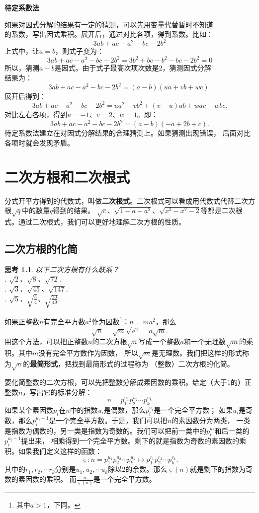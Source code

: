 \documentclass[12pt,UTF8]{ctexbook}
\newtheorem{sk}{思考}[section]
\begin{document}
\noindent \textbf{待定系数法}

\indent 如果对因式分解的结果有一定的猜测，可以先用变量代替暂时不知道\\
\indent 的系数，写出因式乘积。展开后，通过对比各项，得到系数。比如：
$$ 3ab + ac - a^2- bc -2b^2 $$
\indent 上式中，让$a = b$，则式子变为：
$$ 3ab + ac - a^2- bc -2b^2 = 3b^2 + bc - b^2- bc -2b^2 = 0$$
\indent 所以，猜测$a - b$是因式。由于式子最高次项次数是$2$，猜测因式分解\\
\indent 结果为：
$$ 3ab + ac - a^2- bc -2b^2 = (a - b)(ua + vb + wc).$$
\indent 展开后得到：
$$ 3ab + ac - a^2- bc -2b^2 = ua^2 + vb^2 + (v - u)ab + wac - wbc. $$
\indent 对比左右各项，得到$u = -1$、$v = 2$、$w = 1$。即：
$$ 3ab + ac - a^2- bc -2b^2 = (a - b)(-a + 2b + c).$$
\indent 待定系数法建立在对因式分解结果的合理猜测上。如果猜测出现错误，
\indent 后面对比各项时就会发现矛盾。


\chapter{二次方根和二次根式}
分式开平方得到的代数式，叫做\textbf{二次根式}。二次根式可以看成用代数式代替二次方根$\sqrt{q}$中的数量$q$得到的结果。
$\sqrt{c}$、$\sqrt{1 - a + a^2}$、$\sqrt{x^3 - x^2 - 2}$等都是二次根式。通过二次根式，我们可以更好地理解二次方根的性质。
\section{二次方根的化简}
\begin{sk}\label{sk:3-0-0}
    以下二次方根有什么联系？\\
    . $\sqrt{2}$、$\sqrt{8}$、$\sqrt{72}$.\\
    . $\sqrt{3}$、$\sqrt{45}$、$\sqrt{147}$.\\
    . $\sqrt{5}$、$\sqrt{\frac{5}{4}}$、$\sqrt{\frac{20}{49}}$.
\end{sk}
如果正整数$n$有完全平方数$a^2$作为因数\footnote{其中$a>1$，下同。}：$n = ma^2$，那么
$$\sqrt{n} = \sqrt{m}\sqrt{a^2} = a\sqrt{m}.$$
用这个方法，可以把正整数$n$的二次方根$\sqrt{n}$写成一个整数$a$和一个无理数$\sqrt{m}$的乘积。其中$m$没有完全平方数作为因数，
所以$\sqrt{m}$是无理数。我们把这样的形式称为$\sqrt{n}$的\textbf{最简形式}，把找到最简形式的过程称为
（整数）二次方根的化简。

要化简整数的二次方根，可以先把整数分解成素因数的乘积。给定（大于$1$的）正整数$n$，写出它的标准分解：
$$n = p_1^{u_1} p_2^{u_2} \cdots p_k^{u_k}$$
如果某个素因数$p_i$在$n$中的指数$u_i$是偶数，那么$p_i^{u_i}$是一个完全平方数；
如果$u_i$是奇数，那么$p_i^{u_i-1}$是一个完全平方数。于是，我们可以把$n$的素因数分为两类，
一类是指数为偶数的，另一类是指数为奇数的。我们可以把前一类中的$p_i^{u_i}$和后一类的$p_i^{u_i-1}$提出来，
相乘得到一个完全平方数。剩下的就是指数为奇数的素因数的乘积。如果我们定义这样的函数：
$$ \varsigma: n = p_1^{u_1} p_2^{u_2} \cdots p_k^{u_k} \mapsto p_1^{r_1} p_2^{r_2} \cdots p_k^{r_k}. $$
其中的$r_1, r_2, \cdots r_k$分别是$u_1, u_2, \cdots u_k$除以$2$的余数。那么$\varsigma(n)$就是剩下的指数为奇数的素因数的乘积。
而$\frac{n}{\varsigma(n)}$是一个完全平方数。
\end{document}
